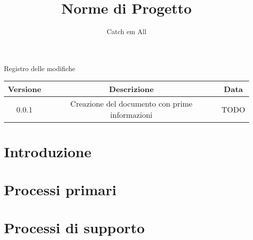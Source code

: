 \documentclass{article}
\title{Norme di Progetto}
\author{Catch em All}
\begin{document}
\date{}
\maketitle

\pagebreak

Registro delle modifiche
\begin{center}
\begin{tabular}{| c | c | c |} 
 Versione & Descrizione & Data \\
 \hline
 0.0.1 & Creazione del documento con prime informazioni & TODO\\
\end{tabular}
\end{center}

\pagebreak

\clearpage
\tableofcontents
\clearpage

\section{Introduzione}


\section{Processi primari}


\section{Processi di supporto}

\end{document}
